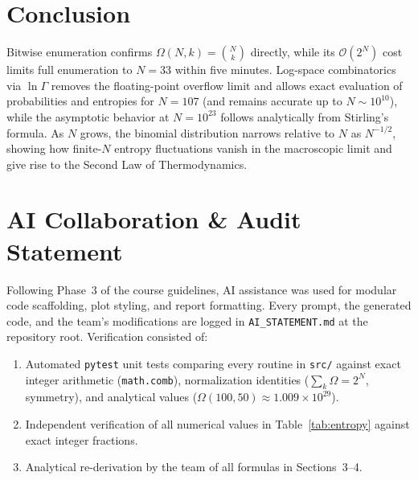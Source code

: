 \documentclass[11pt, a4paper]{article}
\begin{document}
\section{Conclusion}
Bitwise enumeration confirms $\Omega(N,k)=\binom{N}{k}$ directly, while its $\mathcal{O}(2^N)$ cost limits full enumeration to $N=33$ within five minutes. Log-space combinatorics via $\ln\Gamma$ removes the floating-point overflow limit and allows exact evaluation of probabilities and entropies for $N=107$ (and remains accurate up to $N\sim10^{10}$), while the asymptotic behavior at $N=10^{23}$ follows analytically from Stirling's formula. As $N$ grows, the binomial distribution narrows relative to $N$ as $N^{-1/2}$, showing how finite-$N$ entropy fluctuations vanish in the macroscopic limit and give rise to the Second Law of Thermodynamics.

\appendix
\section{AI Collaboration \& Audit Statement}
Following Phase~3 of the course guidelines, AI assistance was used for modular code scaffolding, plot styling, and report formatting. Every prompt, the generated code, and the team's modifications are logged in \texttt{AI\_STATEMENT.md} at the repository root. Verification consisted of:
\begin{enumerate}
\item Automated \texttt{pytest} unit tests comparing every routine in \texttt{src/} against exact integer arithmetic (\texttt{math.comb}), normalization identities ($\sum_k\Omega=2^N$, symmetry), and analytical values ($\Omega(100,50)\approx1.009\times10^{29}$).
\item Independent verification of all numerical values in Table~\ref{tab:entropy} against exact integer fractions.
\item Analytical re-derivation by the team of all formulas in Sections~3--4.
\end{enumerate}

\end{document}
